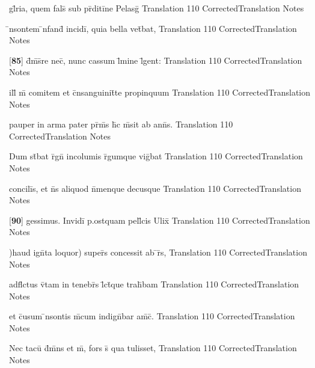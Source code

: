 \latline
  {gl\={}ria, quem fals\={} sub pr\={}diti\={}ne Pelasg\={\macron {\i}}}
  { Translation }
  {110}
  { CorrectedTranslation }
  { Notes }


\latline
  {\={\macron {\i}}nsontem \={\macron {\i}}nfand\={} incidi\={}, quia bella vet\={}bat,}
  { Translation }
  {110}
  { CorrectedTranslation }
  { Notes }


\latline
  {[\textbf{85}] d\={}m\={\macron {\i}}s\={}re nec\={\macron {\i}}, nunc cassum l\={}mine l\={}gent:}
  { Translation }
  {110}
  { CorrectedTranslation }
  { Notes }


\latline
  {ill\={\macron {\i}} m\={} comitem et c\={}nsanguinit\={}te propinquum}
  { Translation }
  {110}
  { CorrectedTranslation }
  { Notes }


\latline
  {pauper in arma pater pr\={\macron {\i}}m\={\macron {\i}}s h\={}c m\={\macron {\i}}sit ab ann\={\macron {\i}}s.}
  { Translation }
  {110}
  { CorrectedTranslation }
  { Notes }


\latline
  {Dum st\={}bat r\={}gn\={} incolumis r\={}gumque vig\={}bat}
  { Translation }
  {110}
  { CorrectedTranslation }
  { Notes }


\latline
  {concili\={\macron {\i}}s, et n\={}s aliquod n\={}menque decusque}
  { Translation }
  {110}
  { CorrectedTranslation }
  { Notes }


\latline
  {[\textbf{90}] gessimus.  Invidi\={} p.ostquam pell\={}cis Ulix\={\macron {\i}}}
  { Translation }
  {110}
  { CorrectedTranslation }
  { Notes }


\latline
  {)haud ign\={}ta loquor) super\={\macron {\i}}s concessit ab \={}r\={\macron {\i}}s,}
  { Translation }
  {110}
  { CorrectedTranslation }
  { Notes }


\latline
  {adfl\={\macron {\i}}ctus v\={\macron {\i}}tam in tenebr\={\macron {\i}}s l\={}ct\={}que trah\={}bam}
  { Translation }
  {110}
  { CorrectedTranslation }
  { Notes }


\latline
  {et c\={}usum \={\macron {\i}}nsontis m\={}cum indign\={}bar am\={\macron {\i}}c\={\macron {\i}}.}
  { Translation }
  {110}
  { CorrectedTranslation }
  { Notes }


\latline
  {Nec tacu\={\macron {\i}} d\={}m\={}ns et m\={}, fors s\={\macron {\i}} qua tulisset,}
  { Translation }
  {110}
  { CorrectedTranslation }
  { Notes }


